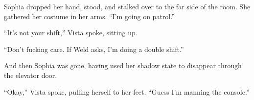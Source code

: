 Sophia dropped her hand, stood, and stalked over to the far side of the room.  She gathered her costume in her arms.  ``I'm going on patrol.''



``It's not your shift,'' Vista spoke, sitting up.



``Don't fucking care.  If Weld asks, I'm doing a double shift.''



And then Sophia was gone, having used her shadow state to disappear through the elevator door.



``Okay,'' Vista spoke, pulling herself to her feet. ``Guess I'm manning the console.''





